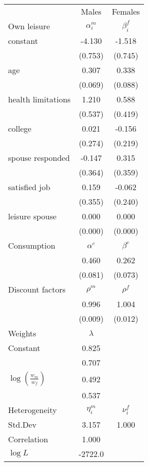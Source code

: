 \begin{tabular}{lcc} 
\hline\hline 
 & Males & Females \\ 
Own leisure & $\alpha_{i}^{m}$ & $\beta_{i}^{f}$ \\ 
constant & -4.130 & -1.518 \\ 
 & (0.753) & (0.745) \\ 
age & 0.307 & 0.338 \\ 
 & (0.069) & (0.088) \\ 
health limitations & 1.210 & 0.588 \\ 
 & (0.537) & (0.419) \\ 
college & 0.021 & -0.156 \\ 
 & (0.274) & (0.219) \\ 
spouse responded & -0.147 & 0.315 \\ 
 & (0.364) & (0.359) \\ 
satisfied job & 0.159 & -0.062 \\ 
 & (0.355) & (0.240) \\ 
leisure spouse & 0.000 & 0.000 \\ 
 & (0.000) & (0.000) \\ 
Consumption & $\alpha^{c}$ & $\beta^{c}$ \\ 
 & 0.460 & 0.262 \\ 
 & (0.081) & (0.073) \\ 
Discount factors & $\rho^m$ & $\rho^f$ \\ 
 & 0.996 & 1.004 \\ 
 & (0.009) & (0.012) \\ 
Weights & $\lambda$ &  \\ 
Constant & 0.825 &  \\ 
 & 0.707 &  \\ 
$\log(\frac{w_m}{w_f})$ & 0.492 &  \\ 
 & 0.537 &  \\ 
Heterogeneity & $\eta_i^m$ & $\nu_i^f$ \\ 
Std.Dev & 3.157 & 1.000 \\ 
Correlation & 1.000 &  \\ 
\hline 
$\log L$ & -2722.0 & \\ 
\hline \hline 
\end{tabular} 
